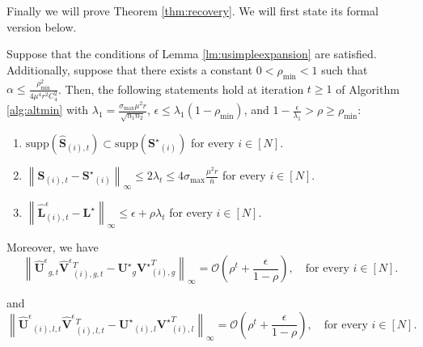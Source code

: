 \documentclass[twoside,11pt]{article}
\newcommand{\norm}[1]{\left\lVert#1\right\rVert}
\newcommand{\supp}[1]{\text{supp}\left(#1\right)}
\newcommand{\matLst}{{\mathbf{L}^\star}}
\newcommand{\matSigma}{\mathbf{\Sigma}}
\newcommand{\matSst}{{\mathbf{S}^\star}}
\newcommand{\matUst}{{\mathbf{U}^\star}}
\newcommand{\matVst}{{\mathbf{V}^\star}}
\newcommand{\hmatLeps}{\hat{\mathbf{L}}^{\epsilon}}
\newcommand{\hmatS}{\hat{\mathbf{S}}}
\newcommand{\hmatUeps}{\hat{\mathbf{U}}^{\epsilon}{}}
\newcommand{\hmatVeps}{\hat{\mathbf{V}}^{\epsilon}{}}
\newcommand{\gop}{\sigma_{\max}}
\newcommand{\bn}{{\overline{n}}}
\newcommand{\sm}{\sigma_{\min}}
\newcommand{\rhom}{\rho_{\min}}
\begin{document}
Finally we will prove Theorem \ref{thm:recovery}. We will first state its formal version below.
\begin{theorem}
\label{thm:formalrecovery}
Suppose that the conditions of Lemma \ref{lm:usimpleexpansion} are satisfied. Additionally, suppose that there exists a constant $0<\rhom<1$ such that  $\alpha \le \frac{\rhom^2}{4\mu^4r^2C_4^2}$. Then, the following statements hold at iteration $t\geq 1$ of Algorithm \ref{alg:altmin} with $\lambda_1= \frac{\gop\mu^2r}{\sqrt{n_1n_2}}$, $\epsilon\le \lambda_1\left(1-\rhom\right)$, and $1-\frac{\epsilon}{\lambda_1}>\rho\ge \rhom$:
\begin{enumerate}
    \item \label{condition:supportcontain}$ \supp{\hmatS_{(i),t}}\subset\supp{\matSst_{(i)}}$ for every $i\in [N]$.
    \item     \label{condition:sdifinfnorm}
    $\norm{\hmatS_{(i),t}-\matSst_{(i)}}_{\infty}\le 2\lambda_t\le 4\gop \frac{\mu^2 r}{\bn}$ for every $i\in [N]$.
    \item     \label{condition:ldifinfnorm}
    $\norm{\hmatLeps_{(i),t}-\matLst}_{\infty}\le \epsilon+\rho\lambda_t$ for every $i\in [N]$.
\end{enumerate} Moreover, we have
\begin{equation}
\label{eqn:ugvgdiffinfnorm}
\norm{\hmatUeps_{g,t}\hmatVeps_{(i),g,t}^T-\matUst_g\matVst_{(i),g}^T}_{\infty}= \mathcal{O}\left(\rho^t+\frac{\epsilon}{1-\rho}\right),\quad   \text{for every  } i\in [N].
\end{equation}

and 
\begin{equation}
\label{eqn:uilvildiffinfnorm}
\norm{\hmatUeps_{(i),l,t}\hmatVeps_{(i),l,t}^T-\matUst_{(i),l}\matVst_{(i),l}^T}_{\infty}= \mathcal{O}\left(\rho^t+\frac{\epsilon}{1-\rho}\right),\quad   \text{for every  } i\in [N].
\end{equation}
\end{theorem}
\end{document}
